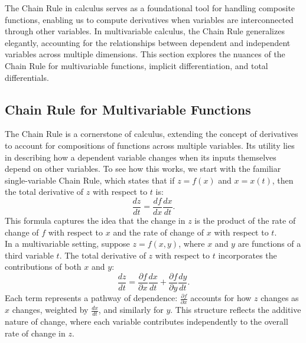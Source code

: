 \newpage


 

\noindent The Chain Rule in calculus serves as a foundational tool for handling composite functions, enabling us to compute derivatives when variables are interconnected through other variables. In multivariable calculus, the Chain Rule generalizes elegantly, accounting for the relationships between dependent and independent variables across multiple dimensions. This section explores the nuances of the Chain Rule for multivariable functions, implicit differentiation, and total differentials.

\subsection*{Chain Rule for Multivariable Functions}

\noindent The Chain Rule is a cornerstone of calculus, extending the concept of derivatives to account for compositions of functions across multiple variables. Its utility lies in describing how a dependent variable changes when its inputs themselves depend on other variables. To see how this works, we start with the familiar single-variable Chain Rule, which states that if \( z = f(x) \) and \( x = x(t) \), then the total derivative of \( z \) with respect to \( t \) is:
\[
\frac{dz}{dt} = \frac{df}{dx} \frac{dx}{dt}.
\]
This formula captures the idea that the change in \( z \) is the product of the rate of change of \( f \) with respect to \( x \) and the rate of change of \( x \) with respect to \( t \). \\

\noindent In a multivariable setting, suppose \( z = f(x, y) \), where \( x \) and \( y \) are functions of a third variable \( t \). The total derivative of \( z \) with respect to \( t \) incorporates the contributions of both \( x \) and \( y \):
\[
\frac{dz}{dt}  =  \frac{\partial f}{\partial x} \frac{dx}{dt} + \frac{\partial f}{\partial y} \frac{dy}{dt}.
\]
Each term represents a pathway of dependence: \( \frac{\partial f}{\partial x} \) accounts for how \( z \) changes as \( x \) changes, weighted by \( \frac{dx}{dt} \), and similarly for \( y \). This structure reflects the additive nature of change, where each variable contributes independently to the overall rate of change in \( z \). \\

